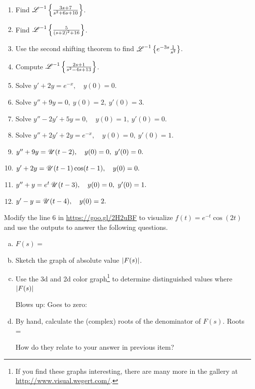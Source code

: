     \begin{question}
      \begin{enumerate}
        \item Find $\operatorname{\mathscr{L}}^{-1}\left\{\frac{3s+7}{s^2+6s+10}\right\}$.
        \item Find $\operatorname{\mathscr{L}}^{-1}\left\{\frac{5}{(s+2)^2+16}\right\}$.
        \item Use the second shifting theorem to find $\operatorname{\mathscr{L}}^{-1}\left\{e^{-3s}\frac{1}{s^2}\right\}$.
        \item Compute $\operatorname{\mathscr{L}}^{-1}\left\{\frac{2s+1}{s^2-4s+13}\right\}$.
        \item Solve $y' + 2y = e^{-x}, \quad y(0)=0$.
        \item Solve $y'' + 9y = 0, \ y(0)=2, \ y'(0)=3$.
        \item Solve $y'' - 2y' + 5y = 0, \quad y(0)=1, \ y'(0)=0$.
        \item Solve $y'' + 2y' + 2y = e^{-x}, \quad y(0)=0, \ y'(0)=1$.
        \item \(y'' + 9y = \hstep(t-2), \quad y(0)=0,\ y'(0)=0.\)  
        \item \(y' + 2y = \operatorname{\mathscr{U}}(t-1)\cos(t-1), \quad y(0)=0.\)  
        \item \(y'' + y = e^t \operatorname{\mathscr{U}}(t-3), \quad y(0)=0,\ y'(0)=1.\)  
        \item \(y' - y = \operatorname{\mathscr{U}}(t-4), \quad y(0)=2.\)  
      \end{enumerate}
    \end{question}


    \begin{sagequestion}
      Modify the line 6 in  \url{https://goo.gl/2H2uBF} to visualize \(f(t) = e^{-t}\cos(2t)\) and use the outputs to answer the following questions.
      \begin{enumerate}[(a)]
        \item \(F(s) = \) \solspace{0.25in}
        \item Sketch the graph of absolute value \(\lvert F(s)\rvert\).
        \item Use the 3d and 2d color graph\footnote{If you find these graphs interesting, there are many more in the gallery at \url{http://www.visual.wegert.com/}.} to determine distinguished values where \(\lvert F(s)\rvert\)

          Blows up: \hspace{0.2in} Goes to zero: \hspace{0.2in}

        \item By hand, calculate the (complex) roots of the denominator of \(F(s)\). Roots =

          How do they relate to your answer in previous item? \solspace{0.25in}
      \end{enumerate}
    \end{sagequestion}


